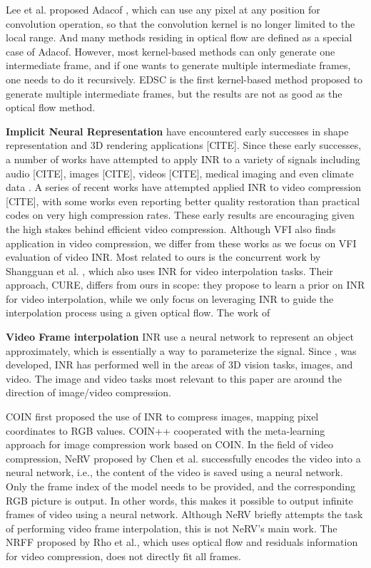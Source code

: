 \documentclass{article}
\begin{document}
Lee et al. proposed Adacof \cite{lee2020adacof}, which can use any pixel at any position for convolution operation,
so that the convolution kernel is no longer limited to the local range.
And many methods residing in optical flow are defined as a special case of Adacof.
However, most kernel-based methods can only generate one intermediate frame, and if one wants to generate multiple intermediate frames, one needs to do it recursively.
EDSC \cite{cheng2021multiple} is the first kernel-based method proposed to generate multiple intermediate frames, but the results are not as good as the optical flow method.


\textbf{ Implicit Neural Representation} have encountered early successes in
shape representation and 3D rendering applications [CITE].
Since these early successes, a number of works have attempted to
apply INR to a variety of signals including audio [CITE], images [CITE], videos [CITE],
medical imaging and even climate data \cite{dupont2022coin++}.
A series of recent works have attempted applied INR to video compression [CITE],
with some works \cite{chen2021nerv} even reporting better quality restoration than practical codes on very high compression rates.
These early results are encouraging given the high stakes behind efficient video compression.
Although VFI also finds application in video compression,
we differ from these works as we focus on VFI evaluation of video INR.
Most related to ours is the concurrent work by Shangguan et al. \cite{shangguan2022learning},
which also uses INR for video interpolation tasks.
Their approach, CURE, differs from ours in scope:
they propose to learn a prior on INR for video interpolation,
while we only focus on leveraging INR to guide the interpolation process using a given optical flow.
The work of 

\textbf{Video Frame interpolation}
INR use a neural network to represent an object approximately, which is essentially a way to parameterize the signal.
Since \cite{mildenhall2020nerf}, \cite{sitzmann2020implicit} was developed, INR has performed well in the areas of 3D vision tasks, images, and video.
The image and video tasks most relevant to this paper are around the direction of image/video compression.

COIN \cite{dupont2021coin} first proposed the use of INR to compress images, mapping pixel coordinates to RGB values.
COIN++  cooperated with the meta-learning approach for image compression work based on COIN.
In the field of video compression, NeRV  proposed by Chen et al.
successfully encodes the video into a neural network, i.e., the content of the video is saved using a neural network.
Only the frame index of the model needs to be provided, and the corresponding RGB picture is output.
In other words, this makes it possible to output infinite frames of video using a neural network.
Although NeRV briefly attempts the task of performing video frame interpolation, this is not NeRV's main work.
The NRFF \cite{rho2022neural} proposed by Rho et al., which uses optical flow and residuals information for video compression, does not directly fit all frames.
\end{document}
